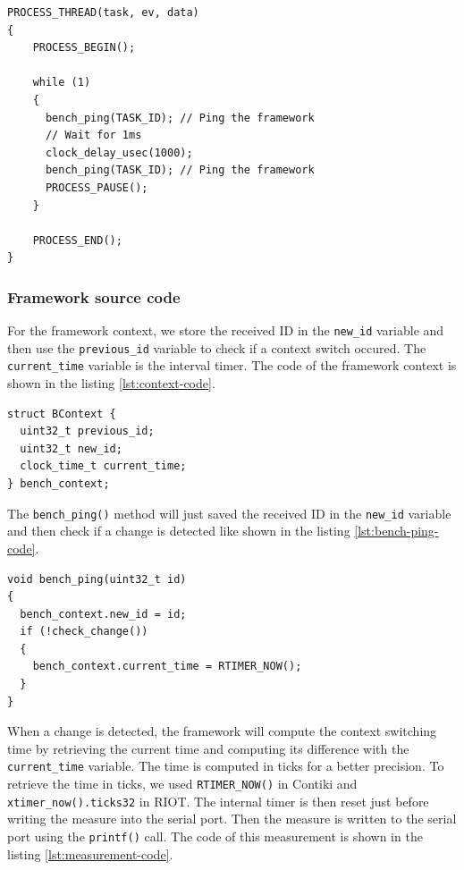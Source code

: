 \begin{lstlisting}[float, style=CStyle, label={lst:bench-task-code}, caption={source code of the application task with \texttt{bench\_ping()} calls}]
PROCESS_THREAD(task, ev, data)
{
    PROCESS_BEGIN();

    while (1)
    {
      bench_ping(TASK_ID); // Ping the framework
      // Wait for 1ms
      clock_delay_usec(1000);
      bench_ping(TASK_ID); // Ping the framework
      PROCESS_PAUSE();
    }

    PROCESS_END();
}
\end{lstlisting}

\subsubsection{Framework source code}

For the framework context, we store the received ID in the \texttt{new\_id} variable 
  and then use the \texttt{previous\_id} variable to check if a context switch occured.
The \texttt{current\_time} variable is the interval timer.
The code of the framework context is shown in the listing \ref{lst:context-code}.

\begin{lstlisting}[style=CStyle, float, label={lst:context-code}, caption={framework context implementation}]
struct BContext {
  uint32_t previous_id;
  uint32_t new_id;
  clock_time_t current_time;
} bench_context;
\end{lstlisting}

The \texttt{bench\_ping()} method will just saved the received ID in the \texttt{new\_id} variable 
  and then check if a change is detected like shown in the listing \ref{lst:bench-ping-code}.

\begin{lstlisting}[style=CStyle, float, label={lst:bench-ping-code}, caption={\texttt{bench\_ping()} implementation}]
void bench_ping(uint32_t id)
{
  bench_context.new_id = id;
  if (!check_change())
  {
    bench_context.current_time = RTIMER_NOW();
  }
}
\end{lstlisting}

When a change is detected, the framework will compute the context switching time 
  by retrieving the current time and computing its difference with the \texttt{current\_time} variable.
The time is computed in ticks for a better precision.
To retrieve the time in ticks, we used \texttt{RTIMER\_NOW()} in Contiki and \texttt{xtimer\_now().ticks32} in RIOT.
The internal timer is then reset just before writing the measure into the serial port.
Then the measure is written to the serial port using the \texttt{printf()} call.
The code of this measurement is shown in the listing \ref{lst:measurement-code}.

